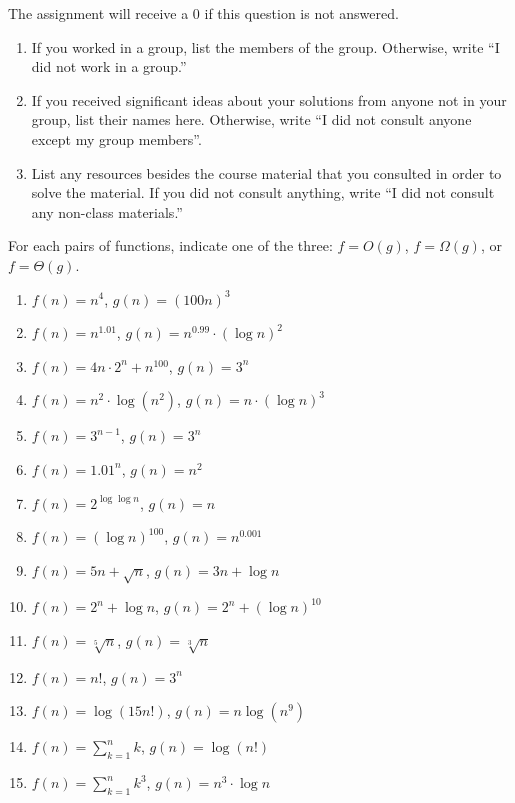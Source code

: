\documentclass[11pt]{article}
\begin{document}
\begin{qunlist}

	The assignment will receive a 0 if this question is not answered.
\begin{enumerate}
	\item If you worked in a group, list the members of the group. Otherwise, write ``I did not work in a group.''
	\item If you received significant ideas about your solutions from anyone not in your group, list their names here. Otherwise, write ``I did not consult  anyone except my group members''.
	\item List any resources besides the course material that you consulted in order to solve the material. If you did not consult anything, write ``I did not consult any non-class materials.''
\end{enumerate}

For each pairs of functions, indicate one of the three: $f = O(g)$, $f = \Omega(g)$, or $f = \Theta(g)$.
\begin{enumerate}
\item $f(n) = n^4$, $g(n) = (100n)^{3}$
\item $f(n) = n^{1.01}$, $g(n) = n^{0.99}\cdot (\log n)^2$
\item $f(n) = 4n\cdot 2^n + n^{100}$, $g(n) = 3^n$
\item $f(n) = n^2\cdot \log (n^2)$, $g(n) = n \cdot (\log n)^3$
\item $f(n) = 3^{n-1}$, $g(n) = 3^n$
\item $f(n) = 1.01^n$, $g(n) = n^2$
\item $f(n) = 2^{\log\log n}$, $g(n) = n$
\item $f(n) = (\log n)^{100}$, $g(n) = n^{0.001}$
\item $f(n) = 5n + \sqrt n$, $g(n) = 3n + \log n$
\item $f(n) = 2^n + \log n$, $g(n) = 2^n + (\log n)^{10}$
\item $f(n) = \sqrt[5]{n}$, $g(n) = \sqrt[3]{n}$
\item $f(n) = n!$, $g(n) = 3^n$
\item $f(n) = \log(15n!)$, $g(n) = n\log (n^9)$
\item $f(n) = \sum_{k=1}^n k$, $g(n) = \log (n!)$
\item $f(n) = \sum_{k=1}^n k^3$, $g(n) = n^3\cdot \log n$
\end{enumerate}



\end{qunlist}
\end{document}
